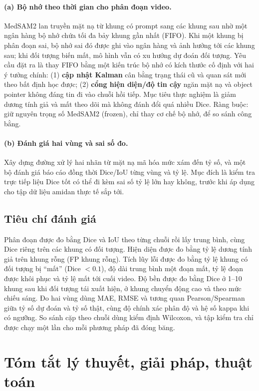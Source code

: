 \documentclass[a4paper,12pt]{report}
\begin{document}
\paragraph{(a) Bộ nhớ theo thời gian cho phân đoạn video.} MedSAM2 lan truyền mặt nạ từ khung có prompt sang các khung sau nhờ một ngân hàng bộ nhớ chứa tối đa bảy khung gần nhất (FIFO). Khi một khung bị phân đoạn sai, bộ nhớ sai đó được ghi vào ngân hàng và ảnh hưởng tới các khung sau; khi đối tượng biến mất, mô hình vẫn có xu hướng dự đoán đối tượng. Yêu cầu đặt ra là thay FIFO bằng một kiến trúc bộ nhớ có kích thước cố định với hai ý tưởng chính: (1) \textbf{cập nhật Kalman} cân bằng trạng thái cũ và quan sát mới theo bất định học được; (2) \textbf{cổng hiện diện/độ tin cậy} ngăn mặt nạ và object pointer không đáng tin đi vào chuỗi hồi tiếp. Mục tiêu thực nghiệm là giảm dương tính giả và mất theo dõi mà không đánh đổi quá nhiều Dice. Ràng buộc: giữ nguyên trọng số MedSAM2 (frozen), chỉ thay cơ chế bộ nhớ, để so sánh công bằng.

\paragraph{(b) Đánh giá hai vùng và sai số đo.} Xây dựng đường xử lý hai nhãn từ mặt nạ mã hóa mức xám đến tỷ số, và một bộ đánh giá báo cáo đồng thời Dice/IoU từng vùng và tỷ lệ. Mục đích là kiểm tra trực tiếp liệu Dice tốt có thể đi kèm sai số tỷ lệ lớn hay không, trước khi áp dụng cho tập dữ liệu amidan thực tế sắp tới.

\subsection{Tiêu chí đánh giá}

Phân đoạn được đo bằng Dice và IoU theo từng chuỗi rồi lấy trung bình, cùng Dice riêng trên các khung có đối tượng. Hiện diện được đo bằng tỷ lệ dương tính giả trên khung rỗng (FP khung rỗng). Tích lũy lỗi được đo bằng tỷ lệ khung có đối tượng bị ``mất'' (Dice $<0.1$), độ dài trung bình một đoạn mất, tỷ lệ đoạn được khôi phục và tỷ lệ mất tới cuối video. Độ bền được đo bằng Dice ở 1--10 khung sau khi đối tượng tái xuất hiện, ở khung chuyển động cao và theo mức chiếu sáng. Đo hai vùng dùng MAE, RMSE và tương quan Pearson/Spearman giữa tỷ số dự đoán và tỷ số thật, cùng độ chính xác phân độ và hệ số kappa khi có ngưỡng. So sánh cặp theo chuỗi dùng kiểm định Wilcoxon, và tập kiểm tra chỉ được chạy một lần cho mỗi phương pháp đã đóng băng.

\section{Tóm tắt lý thuyết, giải pháp, thuật toán}
\end{document}
